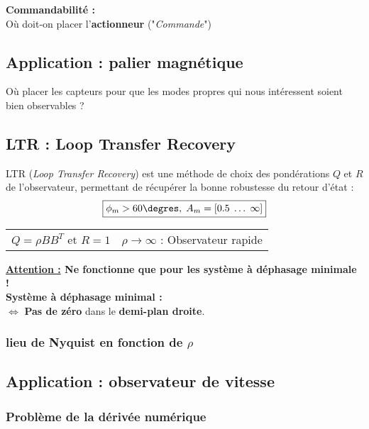 \documentclass[document.tex]{subfiles}
\begin{document}
\textbf{Commandabilité :}\\
Où doit-on placer l'\textbf{actionneur} ("\textit{Commande}")


\subsection{Application : palier magnétique}

Où placer les capteurs pour que les modes propres qui nous intéressent soient bien observables ?





\subsection{LTR : Loop Transfer Recovery}


LTR (\textit{Loop Transfer Recovery}) est une méthode de choix des pondérations $Q$ et $R$ de l'observateur, permettant de récupérer la bonne robustesse du retour d'état :
$$ \boxed{\phi_m > 60 \degres,\; A_m = [0.5 \; \ldots \; \infty]} $$

\begin{center}
\begin{tabular}{l l}
$Q = \rho B B^T$ et $R=1$ & $\rho \longrightarrow \infty$ : Observateur rapide
\end{tabular}
\end{center}


\textbf{\underline{Attention :} Ne fonctionne que pour les système à déphasage minimale !} \\

\textbf{Système à déphasage minimal :}\\
$\Leftrightarrow$ \textbf{Pas de zéro} dans le \textbf{demi-plan droite}.


\subsubsection{lieu de Nyquist en fonction de $\rho$}


\subsection{Application : observateur de vitesse}


\subsubsection{Problème de la dérivée numérique}
\end{document}
